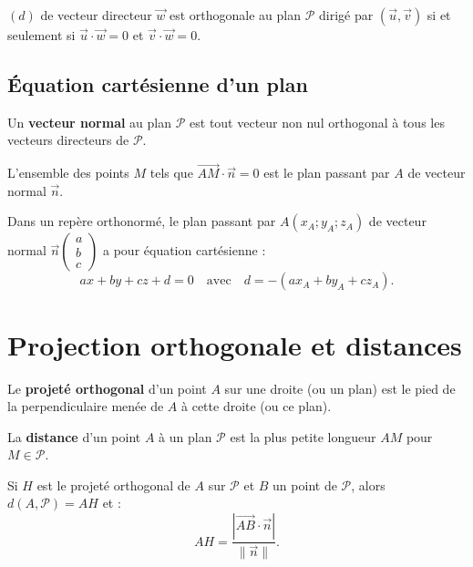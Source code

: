 \documentclass[11pt,a4paper,openany]{book}
\theoremstyle{definition}
\newcommand{\vc}[1]{\overrightarrow{#1}}
\newcommand{\vcb}[3]{
    \left(\begin{array}{c}
        #1\\
        #2\\
        #3
    \end{array}\right)}
\begin{document}
    \begin{Propriété}
        $(d)$ de vecteur directeur $\vc{w}$ est orthogonale au plan $\mathcal{P}$ dirigé par
        $(\vc{u},\vc{v})$ si et seulement si $\vc{u}\cdot\vc{w}=0$ et $\vc{v}\cdot\vc{w}=0$.
    \end{Propriété}

    \subsection{Équation cartésienne d'un plan}
    \begin{Définition}
        Un \textbf{vecteur normal} au plan $\mathcal{P}$ est tout vecteur non nul orthogonal
        à tous les vecteurs directeurs de $\mathcal{P}$.
    \end{Définition}

    \begin{Propriété}
        L'ensemble des points $M$ tels que $\vc{AM}\cdot\vc{n}=0$ est le plan passant par
        $A$ de vecteur normal $\vc{n}$.
    \end{Propriété}

    \begin{Propriété}
        Dans un repère orthonormé, le plan passant par $A(x_A;y_A;z_A)$ de vecteur normal
        $\vc{n}\vcb{a}{b}{c}$ a pour équation cartésienne :
        \[
            ax+by+cz+d=0 \quad\text{avec}\quad d=-(ax_A+by_A+cz_A).
        \]
    \end{Propriété}

    \section{Projection orthogonale et distances}
    \begin{Définition}
        Le \textbf{projeté orthogonal} d'un point $A$ sur une droite (ou un plan) est le pied
        de la perpendiculaire menée de $A$ à cette droite (ou ce plan).
    \end{Définition}

    \begin{Définition}
        La \textbf{distance} d'un point $A$ à un plan $\mathcal{P}$ est la plus petite
        longueur $AM$ pour $M\in\mathcal{P}$.
    \end{Définition}

    \begin{Propriété}
        Si $H$ est le projeté orthogonal de $A$ sur $\mathcal{P}$ et $B$ un point de
        $\mathcal{P}$, alors $d(A,\mathcal{P})=AH$ et :
        \[
            AH=\frac{|\vc{AB}\cdot\vc{n}|}{\|\vc{n}\|}.
        \]
    \end{Propriété}
\end{document}
